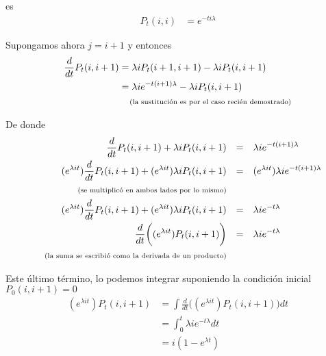 es
\begin{align}
    P_t(i, i)   &=  e^{-t i \lambda}    
\end{align}

Supongamos ahora $j = i + 1$ y entonces
\begin{align}
     \frac{d}{dt}    P_t(i, i+1)    &=  \lambda i P_t(i+1,i+1)  - \lambda i P_t(i,i+1)          \\   
                                    &=  \lambda i e^{-t (i+1) \lambda}  - \lambda i P_t(i,i+1)  \\
                                    &\;\;\;\;\mbox{{\scriptsize(la sustitución es por el caso recién demostrado)}}
\end{align}

De donde
\begin{align}
     \frac{d}{dt}P_t(i, i+1)  +  \lambda i P_t(i,i+1)                                       &&=&&&      \lambda i e^{-t (i+1) \lambda}                  \\
     (e^{\lambda i t}) \frac{d}{dt}P_t(i, i+1)  + (e^{\lambda i t}) \lambda i P_t(i,i+1)    &&=&&&      (e^{\lambda i t}) \lambda i e^{-t (i+1) \lambda}\\
     \;\;\;\;\mbox{{\scriptsize(se multiplicó en ambos lados por lo mismo)}}                                    && &&&                                                      \\
     (e^{\lambda i t}) \frac{d}{dt}P_t(i, i+1)  + (e^{\lambda i t}) \lambda i P_t(i,i+1)    &&=&&&      \lambda i e^{-t \lambda}                        \\
      \frac{d}{dt} \bigg( (e^{\lambda i t}) P_t(i, i+1) \bigg)                              &&=&&&      \lambda i e^{-t \lambda}                        \\
     \;\;\;\;\mbox{{\scriptsize(la suma se escribió como la derivada de un producto)}}                          && &&&                                                      \\
\end{align}

Este último término, lo podemos integrar suponiendo la condición inicial $P_0(i, i+1) = 0$
\begin{align}
       (e^{\lambda i t}) P_t(i, i+1)    &=  \int \frac{d}{dt} \bigg( (e^{\lambda i t}) P_t(i, i+1) \bigg) dt    \\      
                                        &=  \int_{0}^{t}    \lambda i e^{-t \lambda} dt                         \\    
                                        &=  i (1-e^{\lambda t})                         
\end{align}\pn

